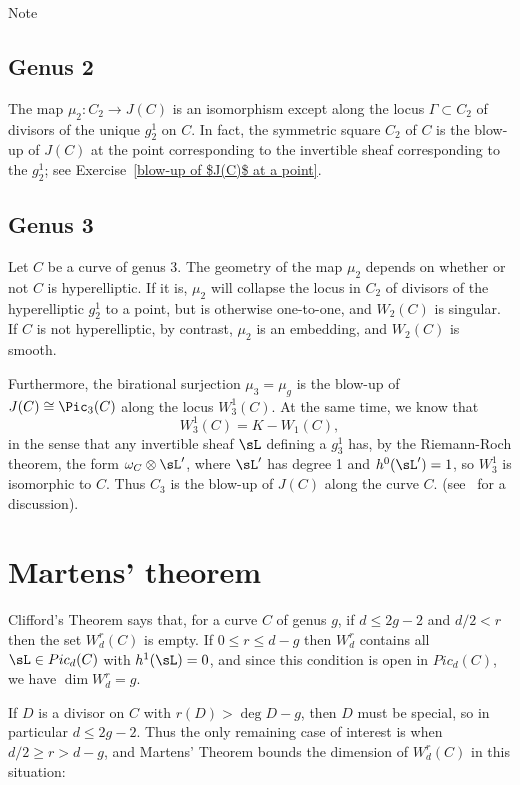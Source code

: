 Note 

\subsection{Genus 2}

The map $\mu_2 : C_{2} \to J(C)$ is an isomorphism except along the locus $\Gamma \subset  C_{2} $ of divisors of the unique $g^1_2$ on $C$. In fact, the symmetric square $ C_{2} $ of $C$ is the blow-up of $J(C)$ at the point corresponding to the invertible sheaf corresponding to the
$g^1_2$; see Exercise~\ref{blow-up of $J(C)$ at a point}.


\subsection{Genus 3}
\begin{fact}
 Let $C$ be a curve of genus 3. The geometry of the map $\mu_2$ depends on whether or not $C$ is hyperelliptic. If it is, $\mu_2$ will collapse the locus in $C_2$ of divisors of the hyperelliptic $g^1_2$ to a point, but is otherwise one-to-one, and $W_2(C)$ is singular.  If $C$ is not hyperelliptic, by contrast, $\mu_2$ is an embedding, and $W_2(C)$ is smooth. 


Furthermore, the birational surjection $\mu_3 = \mu_g$ is the blow-up of $J(C) \cong \Pic_3(C)$ along the locus $W^1_3(C)$. At the same time, we know that
$$
W^1_3(C) = K - W_1(C),
$$
in the sense that any invertible sheaf $\sL$ defining a $g^1_3$ has, by the Riemann-Roch theorem, the form $\omega_C\otimes \sL'$,
where $\sL'$ has degree 1 and $h^0(\sL') = 1$,
so $W^1_3$ is isomorphic to $C$. Thus $C_{3}$ is the blow-up of $J(C)$ along the curve $C$.
(see~\cite[pp. 53--4]{MumfordCJ} for a discussion).
\end{fact}

\section{Martens' theorem}

Clifford's Theorem says that, for a curve $C$ of genus $g$,  if $d\leq 2g-2$ and $d/2 < r$ then the set
 $W^r_d(C)$ is empty. If $0\leq r\leq d-g$ then $W^r_d$ contains all  $\sL\in Pic_d(C)$ with $h^1(\sL) = 0$, 
 and since this condition is open in $Pic_d(C)$, we have $\dim W^r_d = g$.
 
 If $D$ is a divisor on $C$ with  $r(D)>\deg D - g$, then $D$ must be special, so in particular $d\leq 2g-2$. 
 Thus the only remaining case of interest is when $d/2 \geq r > d-g$, and Martens' Theorem bounds the dimension of $W^r_d(C)$ in this situation:
 
